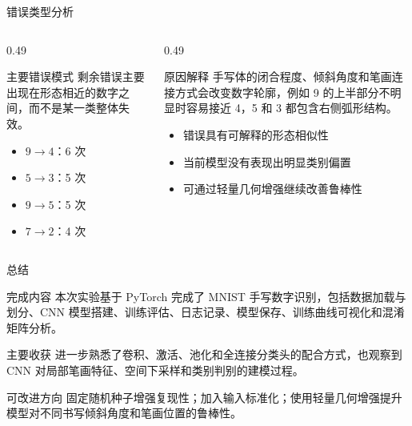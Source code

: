 \documentclass[aspectratio=169,10pt]{ctexbeamer}
\begin{document}
\begin{frame}{错误类型分析}
	\begin{columns}[T,onlytextwidth]
		\begin{column}{0.49\textwidth}
			\begin{block}{主要错误模式}
				剩余错误主要出现在形态相近的数字之间，而不是某一类整体失效。
			\end{block}
			\begin{itemize}
				\item $9\rightarrow4$：6 次
				\item $5\rightarrow3$：5 次
				\item $9\rightarrow5$：5 次
				\item $7\rightarrow2$：4 次
			\end{itemize}
		\end{column}
		\begin{column}{0.49\textwidth}
			\begin{block}{原因解释}
				手写体的闭合程度、倾斜角度和笔画连接方式会改变数字轮廓，例如 9 的上半部分不明显时容易接近 4，5 和 3 都包含右侧弧形结构。
			\end{block}
			\begin{itemize}
				\item 错误具有可解释的形态相似性
				\item 当前模型没有表现出明显类别偏置
				\item 可通过轻量几何增强继续改善鲁棒性
			\end{itemize}
		\end{column}
	\end{columns}
\end{frame}

\begin{frame}{总结}
	\begin{block}{完成内容}
		本次实验基于 PyTorch 完成了 MNIST 手写数字识别，包括数据加载与划分、CNN 模型搭建、训练评估、日志记录、模型保存、训练曲线可视化和混淆矩阵分析。
	\end{block}

	\begin{block}{主要收获}
		进一步熟悉了卷积、激活、池化和全连接分类头的配合方式，也观察到 CNN 对局部笔画特征、空间下采样和类别判别的建模过程。
	\end{block}

	\begin{block}{可改进方向}
		固定随机种子增强复现性；加入输入标准化；使用轻量几何增强提升模型对不同书写倾斜角度和笔画位置的鲁棒性。
	\end{block}
\end{frame}
\end{document}
